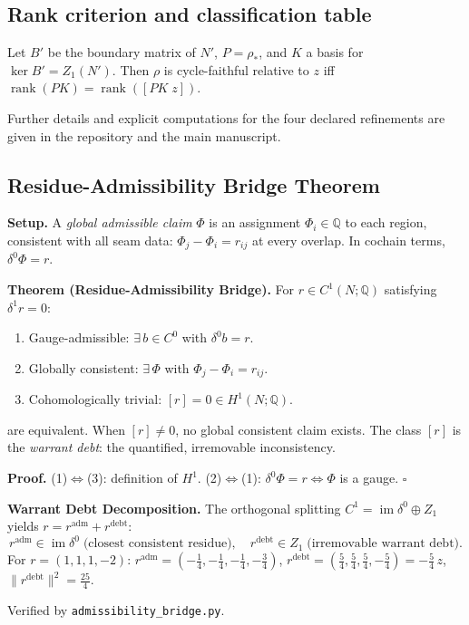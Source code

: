 \subsection{Rank criterion and classification table}
Let $B'$ be the boundary matrix of $N'$, $P=\rho_*$, and $K$ a basis for $\ker B' = Z_1(N')$. Then $\rho$ is cycle-faithful relative to $z$ iff $\operatorname{rank}(PK) = \operatorname{rank}([PK\; z])$.

Further details and explicit computations for the four declared refinements are given in the repository and the main manuscript.

\subsection{Residue-Admissibility Bridge Theorem}

\textbf{Setup.}
A \emph{global admissible claim} $\Phi$ is an assignment $\Phi_i\in\mathbb{Q}$
to each region, consistent with all seam data: $\Phi_j-\Phi_i=r_{ij}$ at every
overlap. In cochain terms, $\delta^0\Phi=r$.

\textbf{Theorem (Residue-Admissibility Bridge).}
For $r\in C^1(N;\mathbb{Q})$ satisfying $\delta^1 r=0$:
\begin{enumerate}
\item Gauge-admissible: $\exists\,b\in C^0$ with $\delta^0 b=r$.
\item Globally consistent: $\exists\,\Phi$ with $\Phi_j-\Phi_i=r_{ij}$.
\item Cohomologically trivial: $[r]=0\in H^1(N;\mathbb{Q})$.
\end{enumerate}
are equivalent. When $[r]\neq0$, no global consistent claim exists.
The class $[r]$ is the \emph{warrant debt}: the quantified, irremovable
inconsistency.

\textbf{Proof.} (1)$\Leftrightarrow$(3): definition of $H^1$.
(2)$\Leftrightarrow$(1): $\delta^0\Phi=r\Leftrightarrow\Phi$ is a gauge.
$\square$

\textbf{Warrant Debt Decomposition.}
The orthogonal splitting $C^1=\operatorname{im}\delta^0\oplus Z_1$ yields
$r=r^{\mathrm{adm}}+r^{\mathrm{debt}}$:
\[
r^{\mathrm{adm}}\in\operatorname{im}\delta^0
\;\text{(closest consistent residue)},
\quad
r^{\mathrm{debt}}\in Z_1
\;\text{(irremovable warrant debt)}.
\]
For $r=(1,1,1,-2)$: $r^{\mathrm{adm}}=(-\tfrac{1}{4},-\tfrac{1}{4},-\tfrac{1}{4},-\tfrac{3}{4})$,
$r^{\mathrm{debt}}=(\tfrac{5}{4},\tfrac{5}{4},\tfrac{5}{4},-\tfrac{5}{4})=-\tfrac{5}{4}\,z$,
$\|r^{\mathrm{debt}}\|^2=\tfrac{25}{4}$.

Verified by \texttt{admissibility\_bridge.py}.
